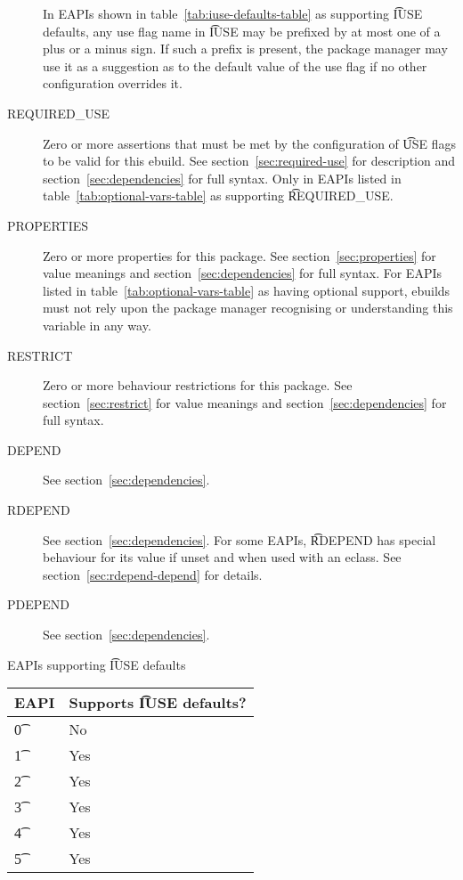 \begin{description}
     In EAPIs shown in table~\ref{tab:iuse-defaults-table} as supporting
    \t{IUSE} defaults, any use flag name in \t{IUSE} may be prefixed by at most one of a plus or a
    minus sign. If such a prefix is present, the package manager may use it as a suggestion as to
    the default value of the use flag if no other configuration overrides it.
\item[REQUIRED\_USE]  Zero or more assertions that must be met by the
    configuration of \t{USE} flags to be valid for this ebuild. See section~\ref{sec:required-use}
    for description and section~\ref{sec:dependencies} for full syntax. Only in EAPIs listed in
    table~\ref{tab:optional-vars-table} as supporting \t{REQUIRED\_USE}.
\item[PROPERTIES]  Zero or more properties for this package.
    See section~\ref{sec:properties} for value meanings and section~\ref{sec:dependencies} for full
    syntax. For EAPIs listed in table~\ref{tab:optional-vars-table} as having optional support,
    ebuilds must not rely upon the package manager recognising or understanding this variable in
    any way.
\item[RESTRICT] Zero or more behaviour restrictions for this package. See section~\ref{sec:restrict}
    for value meanings and section~\ref{sec:dependencies} for full syntax.
\item[DEPEND] See section~\ref{sec:dependencies}.
\item[RDEPEND] See section~\ref{sec:dependencies}. For some EAPIs, \t{RDEPEND} has special behaviour
    for its value if unset and when used with an eclass. See section~\ref{sec:rdepend-depend} for
    details.
\item[PDEPEND] See section~\ref{sec:dependencies}.
\end{description}

\begin{centertable}{EAPIs supporting \t{IUSE} defaults} \label{tab:iuse-defaults-table}
    \begin{tabular}{ l l }
        \toprule
        \multicolumn{1}{c}{\textbf{EAPI}} &
        \multicolumn{1}{c}{\textbf{Supports \t{IUSE} defaults?}} \\
        \midrule
    \t{0} & No \\
    \t{1} & Yes \\
    \t{2} & Yes \\
    \t{3} & Yes \\
    \t{4} & Yes \\
    \t{5} & Yes \\
    \bottomrule
    \end{tabular}
\end{centertable}

